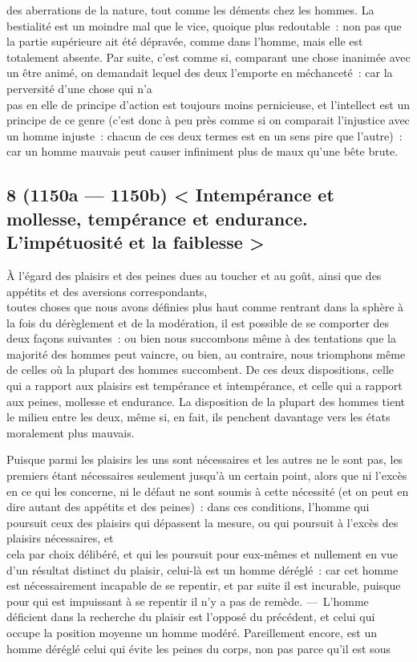 \documentclass[french,twoside]{book} %
\begin{document}
des aberrations de la nature, tout comme les déments chez  les hommes. La bestialité est un moindre mal que le vice, quoique plus redoutable : non pas que la partie supérieure ait été dépravée, comme dans l’homme, mais elle est totalement absente. Par suite, c’est comme si, comparant une chose inanimée avec un être animé, on demandait lequel des deux l’emporte en méchanceté : car la perversité d’une chose qui n’a \\
pas en elle de principe d’action est toujours moins pernicieuse, et l’intellect est un principe de ce genre (c’est donc à peu près comme si on comparait l’injustice avec un homme injuste : chacun de ces deux termes est en un sens pire que l’autre) : car un homme mauvais peut causer infiniment plus de maux qu’une bête brute.
\subsection[{8 (1150a — 1150b) < Intempérance et mollesse, tempérance et endurance. L’impétuosité et la faiblesse >}]{8 (1150a — 1150b) < Intempérance et mollesse, tempérance et endurance. L’impétuosité et la faiblesse >}
\noindent À l’égard des plaisirs et des peines dues au toucher et au goût, ainsi que des appétits et des aversions correspondants, \\
toutes choses que nous avons définies plus haut comme rentrant dans la sphère à la fois du dérèglement et de la modération, il est possible de se comporter des deux façons suivantes : ou bien nous succombons même à des tentations que la majorité des hommes peut vaincre, ou bien, au contraire, nous triomphons même de celles où la plupart des hommes succombent. De ces deux dispositions, celle qui a rapport aux plaisirs est tempérance et intempérance, et celle qui a rapport \\
aux peines, mollesse et endurance. La disposition de la plupart des hommes tient le milieu entre les deux, même si, en fait, ils penchent davantage vers les états moralement plus mauvais.\par
Puisque parmi les plaisirs les uns sont nécessaires et les autres ne le sont pas, les premiers étant nécessaires seulement jusqu’à un certain point, alors que ni l’excès en ce qui les concerne, ni le défaut ne sont soumis à cette nécessité (et on peut en dire autant des appétits et des peines) : dans ces conditions, l’homme qui poursuit ceux des plaisirs qui dépassent la mesure, ou qui poursuit à l’excès des plaisirs nécessaires, et \\
cela par choix délibéré, et qui les poursuit pour eux-mêmes et nullement en vue d’un résultat distinct du plaisir, celui-là est un homme déréglé : car cet homme est nécessairement incapable de se repentir, et par suite il est incurable, puisque pour qui est impuissant à se repentir il n’y a pas de remède. — L’homme déficient dans la recherche du plaisir est l’opposé du précédent, et celui qui occupe la position moyenne un homme modéré. Pareillement encore, est un homme déréglé celui qui évite les peines du corps, non pas parce qu’il est sous \\
\end{document}
